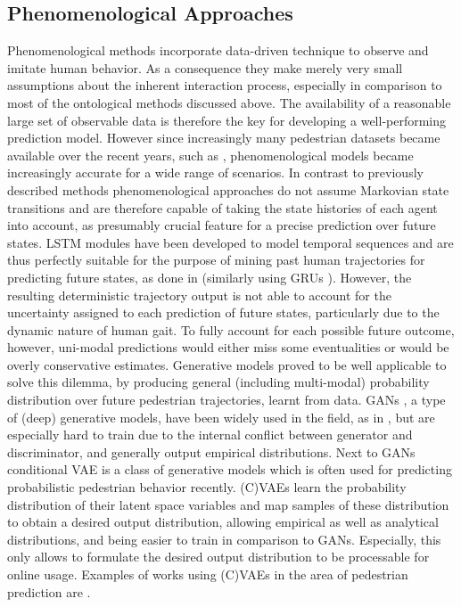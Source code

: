 \subsection{Phenomenological Approaches}
Phenomenological methods incorporate data-driven technique to observe and imitate human behavior. As a consequence they make merely very small assumptions about the inherent interaction process, especially in comparison to most of the ontological methods discussed above. The availability of a reasonable large set of observable data is therefore the key for developing a well-performing prediction model. However since increasingly many pedestrian datasets became available over the recent years, such as \cite{Pellegrini2009}\cite{Rasouli2019}\cite{Caesar2020}, phenomenological models became increasingly accurate for a wide range of scenarios. 
\newline
In contrast to previously described methods phenomenological approaches do not assume Markovian state transitions and are therefore capable of taking the state histories of each agent into account, as presumably crucial feature for a precise prediction over future states. \ac{LSTM} modules \cite{Hochreiter1997} have been developed to model temporal sequences and are thus perfectly suitable for the purpose of mining past human trajectories for predicting future states, as done in \cite{Chen2019a}\cite{Hug2018}\cite{Zhang2019}\cite{Jain2016} (similarly using GRUs \cite{Liu2020}). However, the resulting deterministic trajectory output is not able to account for the uncertainty assigned to each prediction of future states, particularly due to the dynamic nature of human gait. To fully account for each possible future outcome, however, uni-modal predictions would either miss some eventualities or would be overly conservative estimates. 
\newline
Generative models proved to be well applicable to solve this dilemma, by producing general (including multi-modal) probability distribution over future pedestrian  trajectories, learnt from data. \ac{GAN}s \cite{Goodfellow2014}, a type of (deep) generative models, have been widely used in the field, as in \cite{Gupta2018}\cite{Kosaraju2019}\cite{Ouyang2018}, but are especially hard to train due to the internal conflict between generator and discriminator, and generally output empirical distributions. Next to \ac{GAN}s conditional \ac{VAE} is a class of generative models which is often used for predicting probabilistic pedestrian behavior recently. (C)\ac{VAE}s learn the probability distribution of their latent space variables and map samples of these distribution to obtain a desired output distribution, allowing empirical as well as analytical distributions, and being easier to train in comparison to \ac{GAN}s. Especially, this only allows to formulate the desired output distribution to be processable for online usage. Examples of works using (C)\ac{VAE}s in the area of pedestrian prediction are \cite{Ivanovic2018}\cite{Salzmann2020}\cite{Poibrenski2020}\cite{Lee2017}.

